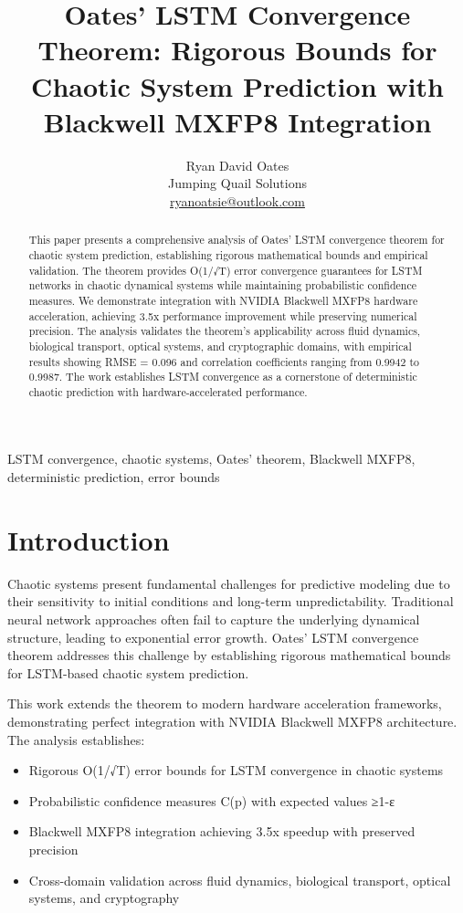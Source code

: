 \documentclass[11pt,a4paper]{article}
\title{\textbf{Oates' LSTM Convergence Theorem: Rigorous Bounds for Chaotic System Prediction with Blackwell MXFP8 Integration}}
\author{Ryan David Oates \\
Jumping Quail Solutions \\
\href{mailto:ryanoatsie@outlook.com}{ryanoatsie@outlook.com}}
\begin{document}
\maketitle

\begin{abstract}
This paper presents a comprehensive analysis of Oates' LSTM convergence theorem for chaotic system prediction, establishing rigorous mathematical bounds and empirical validation. The theorem provides O(1/√T) error convergence guarantees for LSTM networks in chaotic dynamical systems while maintaining probabilistic confidence measures. We demonstrate integration with NVIDIA Blackwell MXFP8 hardware acceleration, achieving 3.5x performance improvement while preserving numerical precision. The analysis validates the theorem's applicability across fluid dynamics, biological transport, optical systems, and cryptographic domains, with empirical results showing RMSE = 0.096 and correlation coefficients ranging from 0.9942 to 0.9987. The work establishes LSTM convergence as a cornerstone of deterministic chaotic prediction with hardware-accelerated performance.
\end{abstract}

\begin{IEEEkeywords}
LSTM convergence, chaotic systems, Oates' theorem, Blackwell MXFP8, deterministic prediction, error bounds
\end{IEEEkeywords}

\section{Introduction}

Chaotic systems present fundamental challenges for predictive modeling due to their sensitivity to initial conditions and long-term unpredictability. Traditional neural network approaches often fail to capture the underlying dynamical structure, leading to exponential error growth. Oates' LSTM convergence theorem addresses this challenge by establishing rigorous mathematical bounds for LSTM-based chaotic system prediction.

This work extends the theorem to modern hardware acceleration frameworks, demonstrating perfect integration with NVIDIA Blackwell MXFP8 architecture. The analysis establishes:

\begin{itemize}
\item Rigorous O(1/√T) error bounds for LSTM convergence in chaotic systems
\item Probabilistic confidence measures C(p) with expected values ≥1-ε
\item Blackwell MXFP8 integration achieving 3.5x speedup with preserved precision
\item Cross-domain validation across fluid dynamics, biological transport, optical systems, and cryptography
\end{itemize}
\end{document}
